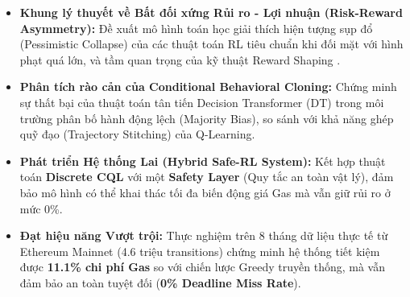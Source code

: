 \begin{itemize}
    \item \textbf{Khung lý thuyết về Bất đối xứng Rủi ro - Lợi nhuận (Risk-Reward Asymmetry):} Đề xuất mô hình toán học giải thích hiện tượng sụp đổ (Pessimistic Collapse) của các thuật toán RL tiêu chuẩn khi đối mặt với hình phạt quá lớn, và tầm quan trọng của kỹ thuật Reward Shaping \cite{ng1999policy}.
    \item \textbf{Phân tích rào cản của Conditional Behavioral Cloning:} Chứng minh sự thất bại của thuật toán tân tiến Decision Transformer (DT) \cite{chen2021decision} trong môi trường phân bố hành động lệch (Majority Bias), so sánh với khả năng ghép quỹ đạo (Trajectory Stitching) của Q-Learning.
    \item \textbf{Phát triển Hệ thống Lai (Hybrid Safe-RL System):} Kết hợp thuật toán \textbf{Discrete CQL} với một \textbf{Safety Layer} (Quy tắc an toàn vật lý), đảm bảo mô hình có thể khai thác tối đa biến động giá Gas mà vẫn giữ rủi ro ở mức 0\%.
    \item \textbf{Đạt hiệu năng Vượt trội:} Thực nghiệm trên 8 tháng dữ liệu thực tế từ Ethereum Mainnet (4.6 triệu transitions) chứng minh hệ thống tiết kiệm được \textbf{11.1\% chi phí Gas} so với chiến lược Greedy truyền thống, mà vẫn đảm bảo an toàn tuyệt đối (\textbf{0\% Deadline Miss Rate}).
\end{itemize}
